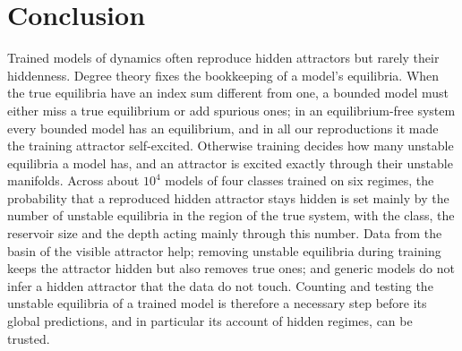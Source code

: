 \section{Conclusion}
\label{sec:conclusion}

Trained models of dynamics often reproduce hidden attractors but rarely their hiddenness. Degree theory fixes the bookkeeping
of a model's equilibria. When the true equilibria have an index sum different from one, a bounded model must either miss a
true equilibrium or add spurious ones; in an equilibrium-free system every bounded model has an equilibrium, and in all
our reproductions it made the training attractor self-excited. Otherwise
training decides how many unstable equilibria a model has, and an attractor is excited exactly through their unstable
manifolds. Across about $10^4$ models of four classes trained on six regimes, the probability that a reproduced hidden
attractor stays hidden is set mainly by the number of unstable equilibria in the region of the true system, with the class, the
reservoir size and the depth acting mainly through this number. Data from the basin of the visible attractor help; removing unstable equilibria during training keeps the attractor hidden but also removes true
ones; and generic models do not infer a hidden attractor that the data do not touch. Counting and testing the unstable
equilibria of a trained model is therefore a necessary step before its global predictions, and in particular its account of
hidden regimes, can be trusted.
